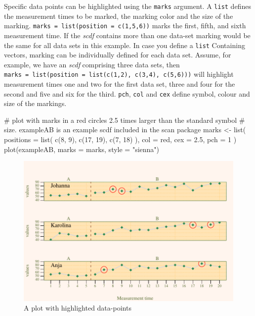 \documentclass[
  letterpaper,
  DIV=11,
  numbers=noendperiod]{scrreprt}
\newenvironment{Shaded}{\begin{snugshade}}{\end{snugshade}}
\newcommand{\AttributeTok}[1]{\textcolor[rgb]{0.40,0.45,0.13}{#1}}
\newcommand{\CommentTok}[1]{\textcolor[rgb]{0.37,0.37,0.37}{#1}}
\newcommand{\DecValTok}[1]{\textcolor[rgb]{0.68,0.00,0.00}{#1}}
\newcommand{\FloatTok}[1]{\textcolor[rgb]{0.68,0.00,0.00}{#1}}
\newcommand{\FunctionTok}[1]{\textcolor[rgb]{0.28,0.35,0.67}{#1}}
\newcommand{\NormalTok}[1]{\textcolor[rgb]{0.00,0.23,0.31}{#1}}
\newcommand{\OtherTok}[1]{\textcolor[rgb]{0.00,0.23,0.31}{#1}}
\newcommand{\StringTok}[1]{\textcolor[rgb]{0.13,0.47,0.30}{#1}}
\begin{document}
Specific data points can be highlighted using the \texttt{marks}
argument. A \texttt{list} defines the measurement times to be marked,
the marking color and the size of the marking.
\texttt{marks\ =\ list(position\ =\ c(1,5,6))} marks the first, fifth,
and sixth measurement time. If the \emph{scdf} contains more than one
data-set marking would be the same for all data sets in this example. In
case you define a \texttt{list} Containing vectors, marking can be
individually defined for each data set. Assume, for example, we have an
\emph{scdf} comprising three data sets, then
\texttt{marks\ =\ list(position\ =\ list(c(1,2),\ c(3,4),\ c(5,6)))}
will highlight measurement times one and two for the first data set,
three and four for the second and five and six for the third.
\texttt{pch}, \texttt{col} and \texttt{cex} define symbol, colour and
size of the markings.

\begin{Shaded}
\begin{Highlighting}[]
\CommentTok{\# plot with marks in a red circles 2.5 times larger than the standard symbol }
\CommentTok{\# size. exampleAB is an example scdf included in the scan package}
\NormalTok{marks }\OtherTok{\textless{}{-}} \FunctionTok{list}\NormalTok{(}
  \AttributeTok{positions =} \FunctionTok{list}\NormalTok{( }\FunctionTok{c}\NormalTok{(}\DecValTok{8}\NormalTok{, }\DecValTok{9}\NormalTok{), }\FunctionTok{c}\NormalTok{(}\DecValTok{17}\NormalTok{, }\DecValTok{19}\NormalTok{), }\FunctionTok{c}\NormalTok{(}\DecValTok{7}\NormalTok{, }\DecValTok{18}\NormalTok{) ), }
  \AttributeTok{col =} \StringTok{\textquotesingle{}red\textquotesingle{}}\NormalTok{, }\AttributeTok{cex =} \FloatTok{2.5}\NormalTok{, }\AttributeTok{pch =} \DecValTok{1}
\NormalTok{)}
\FunctionTok{plot}\NormalTok{(exampleAB, }\AttributeTok{marks =}\NormalTok{ marks, }\AttributeTok{style =} \StringTok{"sienna"}\NormalTok{)}
\end{Highlighting}
\end{Shaded}

\begin{figure}[H]

{\centering \includegraphics{./ch_creating_a_plot_files/figure-pdf/marks-example-1.pdf}

}

\caption{A plot with highlighted data-points}

\end{figure}
\end{document}
